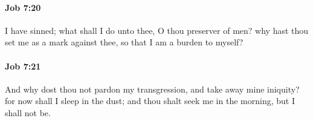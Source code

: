 		\paragraph{Job 7:20} %
			\label{JOB-7-20}

			I have sinned; what shall I do unto thee, O thou preserver of men? why hast thou set me as a mark against thee, so that I am a burden to myself?


		\paragraph{Job 7:21} %
			\label{JOB-7-21}

			And why dost thou not pardon my transgression, and take away mine iniquity? for now shall I sleep in the dust; and thou shalt seek me in the morning, but I shall not be.

